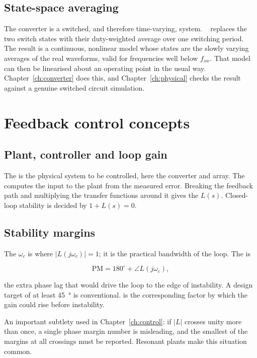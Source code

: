 \subsection{State-space averaging}

The converter is a switched, and therefore time-varying, system. ~\cite{middlebrook} replaces the two switch states with their
duty-weighted average over one switching period. The result is a continuous,
nonlinear model whose states are the slowly varying averages of the real
waveforms, valid for frequencies well below $f_{sw}$. That model can then be
linearised about an operating point in the usual way. Chapter~\ref{ch:converter}
does this, and Chapter~\ref{ch:physical} checks the result against a genuine
switched circuit simulation.

\section{Feedback control concepts}

\subsection{Plant, controller and loop gain}

The  is the physical system to be controlled, here the converter and
array. The  computes the input to the plant from the measured
error. Breaking the feedback path and multiplying the transfer functions around
it gives the  $L(s)$. Closed-loop stability is decided by
$1 + L(s) = 0$.

\subsection{Stability margins}

The  $\omega_c$ is where $|L(j\omega_c)| = 1$; it
is the practical bandwidth of the loop. The  is

\begin{equation}
\mathrm{PM} = 180^\circ + \angle L(j\omega_c),
\end{equation}

the extra phase lag that would drive the loop to the edge of instability. A
design target of at least \SI{45}{\degree} is conventional. 
is the corresponding factor by which the gain could rise before instability.

An important subtlety used in Chapter~\ref{ch:control}: if $|L|$ crosses unity
more than once, a single phase margin number is misleading, and the smallest of
the margins at all crossings must be reported. Resonant plants make this
situation common.


